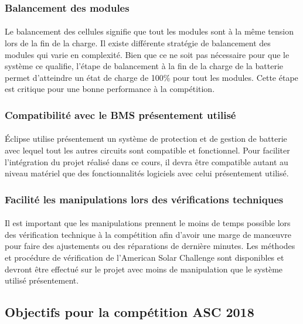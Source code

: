 		\subsubsection{Balancement des modules}
		\paragraph{}
		Le balancement des cellules signifie que tout les modules sont à la même tension lors de la fin de la charge. Il existe différente stratégie de balancement des modules qui varie en complexité. Bien que ce ne soit pas nécessaire pour que le système ce qualifie, l'étape de balancement à la fin de la charge de la batterie permet d'atteindre un état de charge de 100\% pour tout les modules. Cette étape est critique pour une bonne performance à la compétition. 
				
		\subsubsection{Compatibilité avec le BMS présentement utilisé}
		\paragraph{}
		Éclipse utilise présentement un système de protection et de gestion de batterie avec lequel tout les autres circuits sont compatible et fonctionnel. Pour faciliter l'intégration du projet réalisé dans ce cours, il devra être compatible autant au niveau matériel que des fonctionnalités logiciels avec celui présentement utilisé.		
		
		\subsubsection{Facilité les manipulations lors des vérifications techniques}
		\paragraph{}
		Il est important que les manipulations prennent le moins de temps possible lors des vérification technique à la compétition afin d'avoir une marge de manœuvre pour faire des ajustements ou des réparations de dernière minutes. Les méthodes et procédure de vérification de l'American Solar Challenge sont disponibles et devront être effectué sur le projet avec moins de manipulation que le système utilisé présentement.
		
	\subsection{Objectifs pour la compétition ASC 2018}
